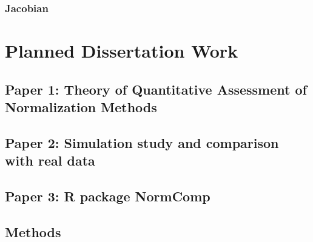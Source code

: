 \documentclass{book}\usepackage[]{graphicx}\usepackage[]{color}
\begin{document}
\subsection{Jacobian}

\chapter{Planned Dissertation Work}

\section{Paper 1:  Theory of Quantitative Assessment of Normalization Methods}

\section{Paper 2:  Simulation study and comparison with real data}

\section{Paper 3:  R package NormComp}



\section{Methods}
\end{document}
